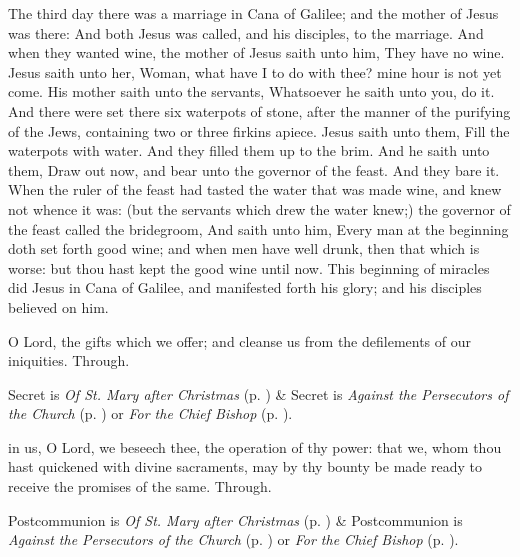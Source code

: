  The third day there was a marriage in Cana of Galilee; and the mother of Jesus was there: And both Jesus was called, and his disciples, to the marriage. And when they wanted wine, the mother of Jesus saith unto him, They have no wine. Jesus saith unto her, Woman, what have I to do with thee? mine hour is not yet come. His mother saith unto the servants, Whatsoever he saith unto you, do it. And there were set there six waterpots of stone, after the manner of the purifying of the Jews, containing two or three firkins apiece. Jesus saith unto them, Fill the waterpots with water. And they filled them up to the brim. And he saith unto them, Draw out now, and bear unto the governor of the feast. And they bare it. When the ruler of the feast had tasted the water that was made wine, and knew not whence it was: (but the servants which drew the water knew;) the governor of the feast called the bridegroom, And saith unto him, Every man at the beginning doth set forth good wine; and when men have well drunk, then that which is worse: but thou hast kept the good wine until now. This beginning of miracles did Jesus in Cana of Galilee, and manifested forth his glory; and his disciples believed on him.

\secret\label{EpiphanyIISecret}
 O Lord, the gifts which we offer; and cleanse us from the defilements of our iniquities. Through.
\begin{rubric}
     Secret is \emph{Of St. Mary after Christmas} (p. \pageref{SPMaryPostChristmas}) \&  Secret is \emph{Against the Persecutors of the Church} (p. \pageref{SPAgainst}) or \emph{For the Chief Bishop} (p. \pageref{SPChiefBishop}).
\end{rubric}
\postcommunion\label{EpiphanyIIPostcommunion}
 in us, O Lord, we beseech thee, the operation of thy power: that we, whom thou hast quickened with divine sacraments, may by thy bounty be made ready to receive the promises of the same. Through.
\begin{rubric}
     Postcommunion is \emph{Of St. Mary after Christmas} (p. \pageref{SPMaryPostChristmas}) \&  Postcommunion is \emph{Against the Persecutors of the Church} (p. \pageref{SPAgainst}) or \emph{For the Chief Bishop} (p. \pageref{SPChiefBishop}).
\end{rubric}


